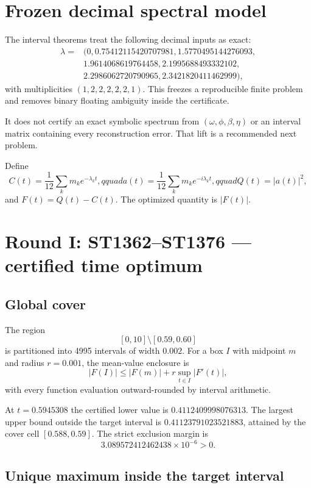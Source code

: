 \documentclass[11pt,a4paper]{article}
\begin{document}
\tableofcontents\newpage

\section{Frozen decimal spectral model}

The interval theorems treat the following decimal inputs as exact:
\begin{align*}
\lambda={}&(0, 0.75412115420707981, 1.5770495144276093,\\
&1.9614068619764458, 2.1995688493332102,\\
&2.2986062720790965, 2.3421820411462999),
\end{align*}
with multiplicities $(1,2,2,2,2,2,1)$.  This freezes a reproducible finite
problem and removes binary floating ambiguity inside the certificate.

It does not certify an exact symbolic spectrum from $(\omega,\phi,\beta,\eta)$
or an interval matrix containing every reconstruction error.  That lift is a
recommended next problem.

Define
\[
C(t)=\frac1{12}\sum_km_ke^{-\lambda_kt},qquad
a(t)=\frac1{12}\sum_km_ke^{-i\lambda_kt},qquad
Q(t)=|a(t)|^2,
\]
and $F(t)=Q(t)-C(t)$.  The optimized quantity is $|F(t)|$.

\section{Round I: ST1362--ST1376 --- certified time optimum}

\subsection{Global cover}

The region
\[
[0,10]\setminus[0.59,0.60]
\]
is partitioned into 4995 intervals of width $0.002$.  For a box $I$ with
midpoint $m$ and radius $r=0.001$, the mean-value enclosure is
\[
 |F(I)|\le |F(m)|+r\sup_{t\in I}|F'(t)|,
\]
with every function evaluation outward-rounded by interval arithmetic.

At $t=0.5945308$ the certified lower value is
$0.4112409998076313$.  The largest upper bound outside the target interval is
$0.41123791023521883$, attained by the cover cell $[0.588,0.59]$.  The strict
exclusion margin is
\[
3.089572412462438\times10^{-6}>0.
\]

\subsection{Unique maximum inside the target interval}
\end{document}
